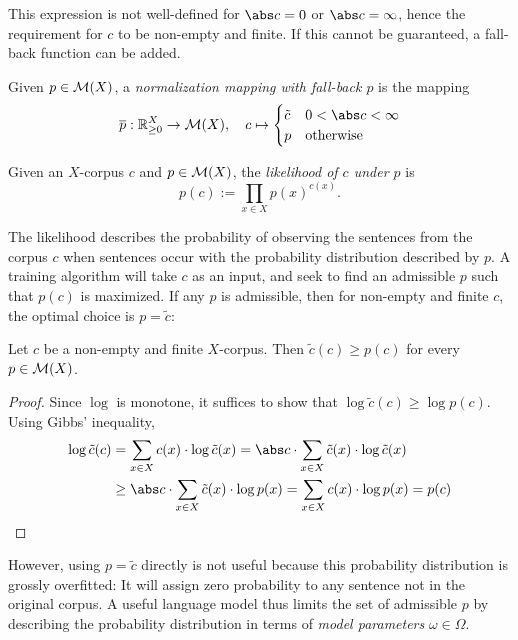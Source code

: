 This expression is not well-defined for $\abs c = 0$ or $\abs c = \infty$, hence the requirement for $c$ to be non-empty and finite. If this cannot be guaranteed, a fall-back function can be added.

\begin{definition}
 Given $p\in\mathcal M(X)$, a \emph{normalization mapping with fall-back $p$} is the mapping
 \[
  \overline p: \zr_{\geq0}^X \to \um(X),
  \quad
  c \mapsto \begin{cases}
   \tilde c & 0 < \abs c < \infty \\ p & \text{otherwise}
  \end{cases}
 \]
\end{definition}

\begin{definition}
 Given an $X$-corpus $c$ and $p\in\mathcal M(X)$, the \emph{likelihood of $c$ under $p$} is
 \[
  p(c) := \prod_{x\in X} p(x)^{c(x)}.
 \]
\end{definition}

The likelihood describes the probability of observing the sentences from the corpus $c$ when sentences occur with the probability distribution described by $p$. A training algorithm will take $c$ as an input, and seek to find an admissible $p$ such that $p(c)$ is maximized. If any $p$ is admissible, then for non-empty and finite $c$, the optimal choice is $p = \tilde c$:

\begin{lemma}\label{lemma:empirical1}
 Let $c$ be a non-empty and finite $X$-corpus. Then $\tilde c(c) \geq p(c)$ for every $p\in\mathcal M(X)$.
\end{lemma}

\begin{proof}
 Since $\log$ is monotone, it suffices to show that $\log\tilde c(c) \geq \log p(c)$. Using Gibbs' inequality,
 \begin{align*}
  \log \tilde c(c)
  &= \sum_{x\in X} c(x) \cdot \log \tilde c(x)
  = \abs c \cdot \sum_{x\in X} \tilde c(x) \cdot \log \tilde c(x) \\
  &\geq \abs c \cdot \sum_{x\in X} \tilde c(x) \cdot \log p(x)
  = \sum_{x\in X} c(x) \cdot \log p(x)
  = p(c)
  \qedhere
 \end{align*}
\end{proof}

However, using $p = \tilde c$ directly is not useful because this probability distribution is grossly overfitted: It will assign zero probability to any sentence not in the original corpus. A useful language model thus limits the set of admissible $p$ by describing the probability distribution in terms of \emph{model parameters} $\omega\in\Omega$.

